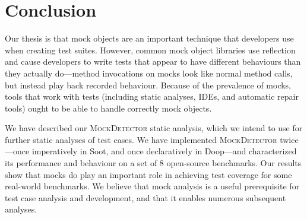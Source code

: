 \section{Conclusion}
\label{sec:conclusion}

Our thesis is that mock objects are an important technique that developers use when creating test suites. However, common mock object libraries use reflection and cause developers to write tests that appear to have different behaviours than they actually do---method invocations on mocks look like normal method calls, but instead play back recorded behaviour. Because of the prevalence of mocks, tools that work with tests (including static analyses, IDEs, and automatic repair tools) ought to be able to handle correctly mock objects. 

We have described our \textsc{MockDetector} static analysis, which we intend to use for further static analyses of test cases. We have implemented \textsc{MockDetector} twice---once imperatively in Soot, and once declaratively in Doop---and characterized its performance and behaviour on a set of 8 open-source benchmarks. Our results show that mocks do play an important role in achieving test coverage for some real-world benchmarks. We believe that mock analysis is a useful prerequisite for test case analysis and development, and that it enables numerous subsequent analyses.



